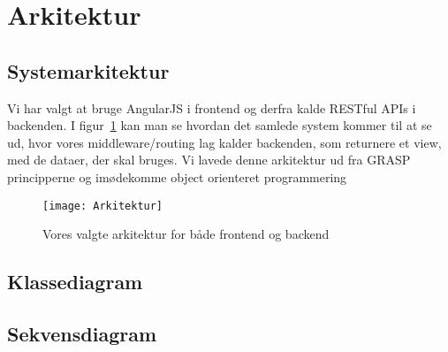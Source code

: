 \section{Arkitektur}
\subsection{Systemarkitektur}
Vi har valgt at bruge AngularJS i frontend og derfra kalde RESTful APIs i backenden. I figur~\ref{fig:arkitektur} 
kan man se hvordan det samlede system kommer til at se ud, hvor vores middleware/routing lag kalder backenden,
som returnere et view, med de dataer, der skal bruges.
Vi lavede denne arkitektur ud fra GRASP principperne og imødekomme object orienteret programmering
\begin{figure}[here]
\texttt{[image: Arkitektur]}
\caption{Vores valgte arkitektur for både frontend og backend}
\label{fig:arkitektur}
\end{figure}

\subsection{Klassediagram}
\subsection{Sekvensdiagram}
